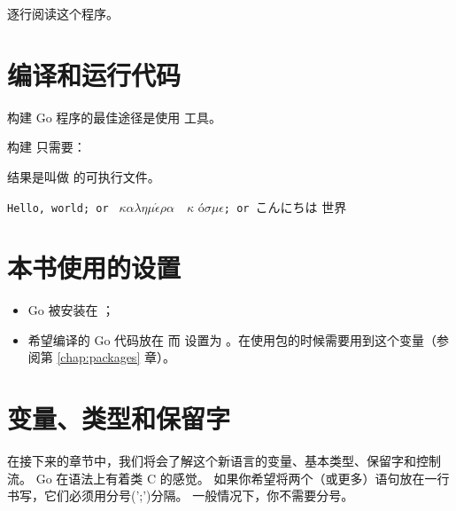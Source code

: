 
逐行阅读这个程序。
\showremarks

\section{编译和运行代码}
\label{sec:building a program}
构建 Go 程序的最佳途径是使用  工具。

构建  只需要：
\begin{display}
\pr {}
\end{display}
结果是叫做  的可执行文件。

\begin{display}
\pr {}
\end{display}
\vspace{-3.0ex}
\texttt{Hello, world; or }%
\begin{math}\kappa\alpha\lambda\eta\mu\acute{\epsilon}\rho\alpha\hspace{1em}\kappa\end{math}%
\'o\begin{math} \sigma\mu\epsilon\end{math}\texttt{; or }こんにちは 世界
\ \newline
\ \newline

\section{本书使用的设置}
\label{sec:settings used}
\begin{itemize}                            
\item Go 被安装在 ；
\item 希望编译的 Go 代码放在  
而  设置为 。在使用包的时候需要用到这个变量（参阅第 
\ref{chap:packages} 章）。
\end{itemize}

\section{变量、类型和保留字}
\label{sec:vars}
在接下来的章节中，我们将会了解这个新语言的变量、基本类型、保留字和控制流。
Go 在语法上有着类 C 的感觉。
如果你希望将两个（或更多）语句放在一行书写，它们必须用分号(';')分隔。
一般情况下，你不需要分号。


